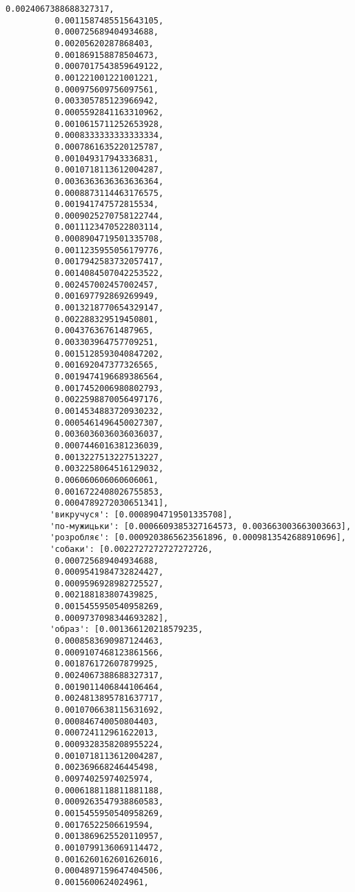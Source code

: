 \documentclass[11pt]{article}
\begin{document}
\begin{Verbatim}[commandchars=\\\{\}]
          0.0024067388688327317,
          0.0011587485515643105,
          0.000725689404934688,
          0.00205620287868403,
          0.001869158878504673,
          0.0007017543859649122,
          0.001221001221001221,
          0.000975609756097561,
          0.003305785123966942,
          0.0005592841163310962,
          0.0010615711252653928,
          0.0008333333333333334,
          0.0007861635220125787,
          0.001049317943336831,
          0.0010718113612004287,
          0.0036363636363636364,
          0.0008873114463176575,
          0.001941747572815534,
          0.0009025270758122744,
          0.0011123470522803114,
          0.0008904719501335708,
          0.0011235955056179776,
          0.0017942583732057417,
          0.0014084507042253522,
          0.002457002457002457,
          0.001697792869269949,
          0.0013218770654329147,
          0.002288329519450801,
          0.00437636761487965,
          0.003303964757709251,
          0.0015128593040847202,
          0.001692047377326565,
          0.0019474196689386564,
          0.0017452006980802793,
          0.0022598870056497176,
          0.0014534883720930232,
          0.0005461496450027307,
          0.0036036036036036037,
          0.0007446016381236039,
          0.0013227513227513227,
          0.0032258064516129032,
          0.006060606060606061,
          0.0016722408026755853,
          0.0004789272030651341],
         'викручуся': [0.0008904719501335708],
         'по-мужицьки': [0.0006609385327164573, 0.003663003663003663],
         'розробляє': [0.0009203865623561896, 0.0009813542688910696],
         'собаки': [0.0022727272727272726,
          0.000725689404934688,
          0.0009541984732824427,
          0.0009596928982725527,
          0.002188183807439825,
          0.0015455950540958269,
          0.0009737098344693282],
         'образ': [0.001366120218579235,
          0.0008583690987124463,
          0.0009107468123861566,
          0.001876172607879925,
          0.0024067388688327317,
          0.0019011406844106464,
          0.0024813895781637717,
          0.0010706638115631692,
          0.000846740050804403,
          0.000724112961622013,
          0.0009328358208955224,
          0.0010718113612004287,
          0.002369668246445498,
          0.00974025974025974,
          0.0006188118811881188,
          0.0009263547938860583,
          0.0015455950540958269,
          0.00176522506619594,
          0.0013869625520110957,
          0.0010799136069114472,
          0.0016260162601626016,
          0.0004897159647404506,
          0.0015600624024961,

\end{Verbatim}
\end{document}
